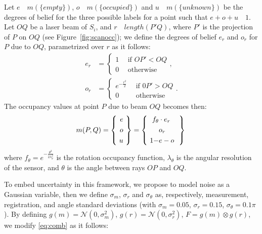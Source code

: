 Let  $e$~\shorteq~$m(\{empty\})$, $o$~\shorteq~$m(\{occupied\})$ and $u$~\shorteq~$m(\{unknown\})$ be the degrees of belief for the three possible labels for a point such that $e + o + u$~\shorteq~$1$. 
Let $OQ$ be a laser beam of $S_i$, and $r$~\shorteq~$length(P'Q)$, where $P'$ is the projection of $P$ on $OQ$ (see Figure~\ref{fig:scanocc});  we define the degrees of belief $e_r$ and $o_r$ for $P$ due to $OQ$, parametrized over $r$ as it follows:
\begin{align}
\label{eq:occ}
 e_r &=  \begin{cases}
               1 \ \ & \text{if $OP' < OQ$}\\
               0 \ \ & \text{otherwise}
         \end{cases},\\
\label{eq:occ_2}
o_r &=  \begin{cases}
      e^{-\frac{r^2}{2}} \ \ & \text{if $0P'> OQ$}\\
      0 \ \ & \text{otherwise}
        \end{cases}.
\end{align}
The occupancy values at point $P$ due to beam $OQ$ becomes then:
\begin{equation}
\label{eq:comb}
 m(P,Q)=\left\{\  \begin{aligned}
                 e\\o\\u
                 \end{aligned}
\  \right\} = \left\{\  \begin{aligned}
                     f_\theta&\cdot e_r \ \\
                     &o_r \ \\
                     1 - &e - o \ 
                    \end{aligned}
\ \right\}\\
\end{equation}
where $f_\theta = e^{-\frac{\theta^2}{2\lambda_\theta^2}}$ is the rotation occupancy function, $\lambda_\theta$ is the angular resolution of the sensor, and $\theta$ is the angle between rays $OP$ and $OQ$.


To embed uncertainty in this framework, we propose to model noise as a Gaussian variable, then we define $\sigma_m$, $\sigma_r$ and $\sigma_\theta$ as, respectively, measurement, registration, and angle standard deviations (with $\sigma_m=0.05$, $\sigma_r=0.15$, $\sigma_{\theta}=0.1\pi$). 
By defining  $g(m) = \mathcal{N}(0, \sigma_m^2)$, $g(r) = \mathcal{N}(0, \sigma_r^2)$, $F = g(m)\otimes g(r)$, we modify \eqref{eq:comb} as it follows:

